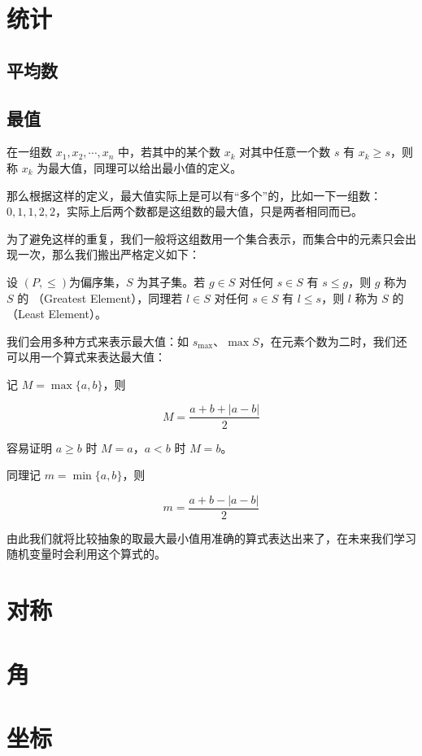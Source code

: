 \section{统计}

\subsection{平均数}

\subsection{最值}

在一组数 $x_1, x_2, \cdots, x_n$ 中，若其中的某个数 $x_k$ 对其中任意一个数 $s$ 有 $x_k \geqslant s$，则称 $x_k$ 为最大值，同理可以给出最小值的定义。

那么根据这样的定义，最大值实际上是可以有“多个”的，比如一下一组数：$0, 1, 1, 2, 2$，实际上后两个数都是这组数的最大值，只是两者相同而已。

为了避免这样的重复，我们一般将这组数用一个集合表示，而集合中的元素只会出现一次，那么我们搬出严格定义如下：

设 $(P,\leqslant )$为偏序集，$S$ 为其子集。若 $g \in S$ 对任何 $s \in S$ 有 $s \leqslant g$，则 $g$ 称为 $S$ 的 （Greatest Element），同理若 $l \in S$ 对任何 $s \in S$ 有 $l \leqslant s$，则 $l$ 称为 $S$ 的 （Least Element）。

我们会用多种方式来表示最大值：如 $s_{\max}$、$\max{S}$，在元素个数为二时，我们还可以用一个算式来表达最大值：

记 $M = \max{\{a, b\}}$，则

$$M = \frac{a + b + |a - b|}{2}$$

容易证明 $a \geqslant b$ 时 $M = a$，$a < b$ 时 $M = b$。

同理记 $m = \min{\{a, b\}}$，则

$$m = \frac{a + b - |a - b|}{2}$$

由此我们就将比较抽象的取最大最小值用准确的算式表达出来了，在未来我们学习随机变量时会利用这个算式的。

\section{对称}

\section{角}

\section{坐标}


